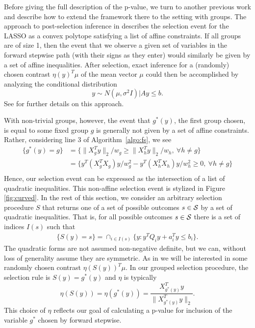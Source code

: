 \documentclass{imsart}
\begin{document}
Before giving the full description of the p-value, we turn to another
previous work and describe how to extend the framework there to the
setting with groups.
The approach to post-selection inference in \cite{lasso:fixed}
describes the selection event for the LASSO as a convex polytope
satisfying a list of affine constraints.
If all groups are of size 1, then
the event that we observe a given set of variables
in the forward stepwise path (with their signs as they enter) would similarly
be given by a set of affine inequalities.
After selection, exact inference for a (randomly) chosen contrast $\eta(y)^T\mu$ of the mean vector
$\mu$ could then be accomplished by analyzing the conditional distribution
\begin{equation}
y \sim N(\mu, \sigma^2 I) \bigl| Ay \leq b.
\end{equation}
See \cite{lasso:fixed,exact:lars} for further details on this approach.

With non-trivial groups, however, the event that $g^*(y)$, the first
group chosen, is equal to some fixed group $g$ is generally not given by
a set of affine constraints. Rather, considering line 3 of Algorithm~\ref{algo:fs}, we see
\begin{equation}
\label{eq:first:quadratic}
\begin{aligned}
\{g^*(y)=g\} &= \{ \|X_g^Ty\|_2 /w_g \geq \|X_h^Ty\|_2 /w_h , \ \forall h \neq g\} \\
&=  \{ y^T(X_g^TX_g)y / w_g^2 - y^T(X_h^TX_h)y / w_h^2 \geq 0, \ \forall h \neq g\} \\
\end{aligned}
\end{equation}
Hence, our selection event can be expressed as 
the intersection of a list of quadratic inequalities. This non-affine selection event is stylized in Figure
\ref{fig:curved}.
In the rest of this section, we consider an arbitrary selection procedure
$S$ that returns one of a set of possible outcomes $s \in {\cal S}$ by a set of quadratic inequalities.
That is, for all possible outcomes $s \in {\cal S}$ there is a set of indices
$I(s)$ such that
\begin{equation}
\label{eq:selection}
\begin{aligned}
\{S(y)=s\} = \cap_{i \in I(s)} \{y: y^TQ_iy + a_i^Ty\leq b_i \}.
\end{aligned}
\end{equation}
The quadratic forms are not assumed non-negative definite, but we can, without loss of generality
assume they are symmetric.
As in \cite{lasso:fixed} we will be interested in some randomly chosen contrast
$\eta(S(y))^T\mu$.
In our grouped selection procedure, the selection rule is $S(y)=g^*(y)$
and $\eta$ is typically 
$$
\eta(S(y)) = \eta(g^*(y)) = \frac{X_{g^*(y)}^Ty}{\|X_{g^*(y)}^Ty\|_2}.
$$
This choice of $\eta$ reflects our goal of calculating a p-value for inclusion of the variable $g^*$ chosen by forward stepwise.
\end{document}
